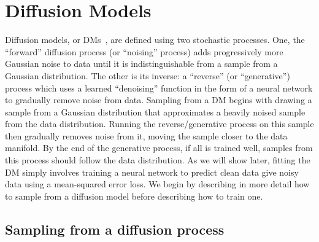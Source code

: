 \chapter{Diffusion Models}
\label{ch:diffusion}

Diffusion models, or DMs~\citep{sohl2015deep,ho2020denoising,nichol2021improved,song2020score}, are defined using two stochastic processes. One, the ``forward'' diffusion process (or ``noising'' process) adds progressively more Gaussian noise to data until it is indistinguishable from a sample from a Gaussian distribution. The other is its inverse: a ``reverse'' (or ``generative'') process which uses a learned ``denoising'' function in the form of a neural network to gradually remove noise from data. Sampling from a DM begins with drawing a sample from a Gaussian distribution that approximates a heavily noised sample from the data distribution. Running the reverse/generative process on this sample then gradually removes noise from it, moving the sample closer to the data manifold. By the end of the generative process, if all is trained well, samples from this process should follow the data distribution. As we will show later, fitting the DM simply involves training a neural network to predict clean data give noisy data using a mean-squared error loss.  We begin by describing in more detail how to sample from a diffusion model before describing how to train one.

\section{Sampling from a diffusion process}

